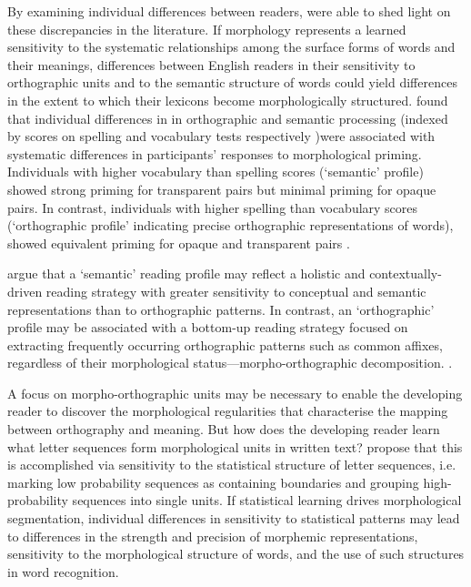 \documentclass[review]{elsarticle}
\begin{document}
By examining individual differences between readers, {\renewcommand\&{and}\citet{andrewsMorphologicalPrimingStronger2013}}  were able to shed light on these discrepancies in the literature.  If morphology represents a learned sensitivity to the systematic relationships among the surface forms of words and their meanings, differences between English readers in their sensitivity to orthographic units and to the semantic structure of words could  yield differences in the extent to which their lexicons become morphologically structured.  {\renewcommand\&{and}\citet{andrewsMorphologicalPrimingStronger2013}} found that individual differences in in orthographic and semantic processing (indexed by scores on spelling and vocabulary tests respectively )were associated with systematic differences in participants' responses to morphological priming.  Individuals with higher vocabulary than spelling scores (`semantic' profile) showed strong priming for transparent pairs but minimal priming for opaque pairs. In contrast, individuals with higher spelling than vocabulary scores (‘orthographic profile’ indicating precise orthographic representations of words), showed equivalent priming for opaque and transparent pairs \citep{andrewsMorphologicalPrimingStronger2013}.

{\renewcommand\&{and}\citet{andrewsMorphologicalPrimingStronger2013}} argue that a `semantic' reading profile may reflect a holistic and contextually-driven reading strategy with greater sensitivity to conceptual and semantic representations than to orthographic patterns.  In contrast, an `orthographic' profile may be associated with a bottom-up reading strategy focused on extracting  frequently occurring orthographic patterns such as common affixes, regardless of their morphological status—morpho-orthographic decomposition.  . 
 
A focus on morpho-orthographic units may be necessary to enable the developing reader to discover the morphological regularities that characterise the mapping between orthography and meaning.  But how does the developing reader learn what letter sequences form morphological units in written text?  {\renewcommand\&{and}\citet{rastleMorphologicalDecompositionBased2008}} propose that this is accomplished via sensitivity to the statistical structure of letter sequences, i.e. marking low probability sequences as containing boundaries and  grouping high- probability sequences into single units. If statistical learning drives morphological segmentation, individual differences in sensitivity to statistical patterns may lead to differences in the strength and precision of morphemic representations,  sensitivity to the morphological structure of words,  and the use of such structures in word recognition. 
\end{document}
